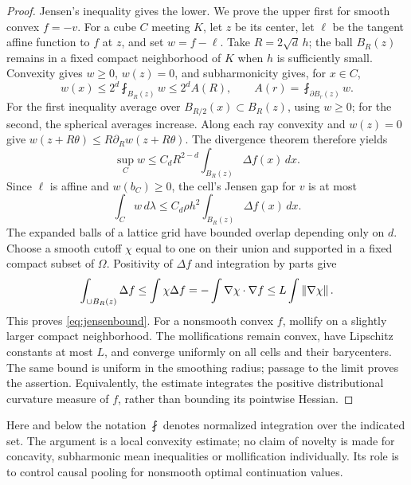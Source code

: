 \begin{proof}
Jensen's inequality gives the lower. We prove the upper first for smooth convex $f=-v$. For a cube $C$ meeting $K$, let $z$ be its center, let $\ell$ be the tangent affine function to $f$ at $z$, and set $w=f-\ell$. Take $R=2\sqrt d\,h$; the ball $B_R(z)$ remains in a fixed compact neighborhood of $K$ when $h$ is sufficiently small. Convexity gives $w\ge0$, $w(z)=0$, and subharmonicity gives, for $x\in C$,
\[
 w(x)\le 2^d\fint_{B_R(z)}w\le2^d A(R),\qquad
 A(r)=\fint_{\partial B_r(z)}w.
\]
For the first inequality average over $B_{R/2}(x)\subset B_R(z)$, using $w\ge0$; for the second, the spherical averages increase. Along each ray convexity and $w(z)=0$ give $w(z+R\theta)\le R\partial_Rw(z+R\theta)$. The divergence theorem therefore yields
\begin{equation}\label{eq:localcurvature}
 \sup_Cw\le C_dR^{2-d}\int_{B_R(z)}\Delta f(x)\,dx.
\end{equation}
Since $\ell$ is affine and $w(b_C)\ge0$, the cell's Jensen gap for $v$ is at most
\[
 \int_C w\,d\lambda\le C_d\rho h^2
                 \int_{B_R(z)}\Delta f(x)\,dx.
\]
The expanded balls of a lattice grid have bounded overlap depending only on $d$. Choose a smooth cutoff $\chi$ equal to one on their union and supported in a fixed compact subset of $\Omega$. Positivity of $\Delta f$ and integration by parts give
\[
 \int_{\cup B_R(z)}\Delta f\le\int\chi\Delta f
      =-\int\nabla\chi\cdot\nabla f
      \le L\int\left\lVert\nabla\chi\right\rVert.
\]
This proves \eqref{eq:jensenbound}. For a nonsmooth convex $f$, mollify on a slightly larger compact neighborhood. The mollifications remain convex, have Lipschitz constants at most $L$, and converge uniformly on all cells and their barycenters. The same bound is uniform in the smoothing radius; passage to the limit proves the assertion. Equivalently, the estimate integrates the positive distributional curvature measure of $f$, rather than bounding its pointwise Hessian.
\end{proof}
Here and below the notation $\fint$ denotes normalized integration over the indicated set. The argument is a local convexity estimate; no claim of novelty is made for concavity, subharmonic mean inequalities or mollification individually. Its role is to control causal pooling for nonsmooth optimal continuation values.

